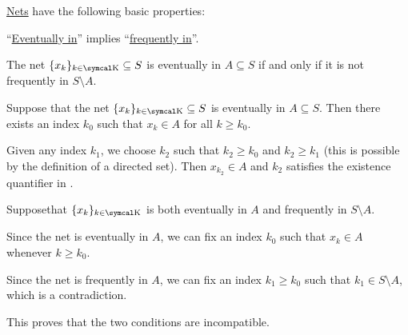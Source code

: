 \begin{Proposition}\label{thm:topological_net_properties}
  \hyperref[def:topological_net]{Nets} have the following basic properties:

  \begin{PropEnum}
     \enquote{\hyperref[def:topological_net/eventually_in]{Eventually in}} implies \enquote{\hyperref[def:topological_net/frequently_in]{frequently in}}.

     The net \( \{ x_k \}_{k \in \CK} \subseteq S \) is eventually in \( A \subseteq S \) if and only if it is not frequently in \( S \setminus A \).
  \end{PropEnum}
\end{Proposition}
\begin{RefListProof}
     Suppose that the net \( \{ x_k \}_{k \in \CK} \subseteq S \) is eventually in \( A \subseteq S \). Then there exists an index \( k_0 \) such that \( x_k \in A \) for all \( k \geq k_0 \).

    Given any index \( k_1 \), we choose \( k_2 \) such that \( k_2 \geq k_0 \) and \( k_2 \geq k_1 \) (this is possible by the definition of a directed set). Then \( x_{k_2} \in A \) and \( k_2 \) satisfies the existence quantifier in .

     Suppose\LEM that \( \{ x_k \}_{k \in \CK} \) is both eventually in \( A \) and frequently in \( S \setminus A \).

    Since the net is eventually in \( A \), we can fix an index \( k_0 \) such that \( x_k \in A \) whenever \( k \geq k_0 \).

    Since the net is frequently in \( A \), we can fix an index \( k_1 \geq k_0 \) such that \( k_1 \in S \setminus A \), which is a contradiction.

    This proves that the two conditions are incompatible.
\end{RefListProof}


